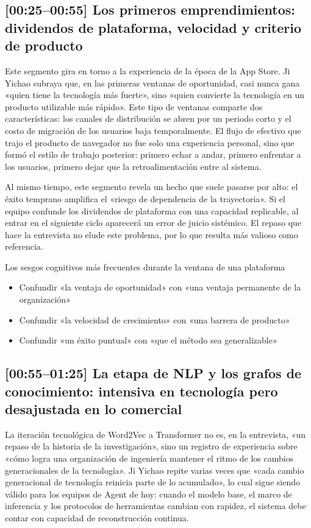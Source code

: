 \documentclass[a4paper]{article}
\begin{document}
\subsection{[00:25--00:55] Los primeros emprendimientos: dividendos de plataforma, velocidad y criterio de producto}

Este segmento gira en torno a la experiencia de la época de la App Store. Ji Yichao subraya que, en las primeras ventanas de oportunidad, casi nunca gana «quien tiene la tecnología más fuerte», sino «quien convierte la tecnología en un producto utilizable más rápido». Este tipo de ventanas comparte dos características: los canales de distribución se abren por un periodo corto y el costo de migración de los usuarios baja temporalmente. El flujo de efectivo que trajo el producto de navegador no fue solo una experiencia personal, sino que formó el estilo de trabajo posterior: primero echar a andar, primero enfrentar a los usuarios, primero dejar que la retroalimentación entre al sistema.

Al mismo tiempo, este segmento revela un hecho que suele pasarse por alto: el éxito temprano amplifica el «riesgo de dependencia de la trayectoria». Si el equipo confunde los dividendos de plataforma con una capacidad replicable, al entrar en el siguiente ciclo aparecerá un error de juicio sistémico. El repaso que hace la entrevista no elude este problema, por lo que resulta más valioso como referencia.

\begin{warningbox}{Los sesgos cognitivos más frecuentes durante la ventana de una plataforma}
\begin{itemize}
    \item Confundir «la ventaja de oportunidad» con «una ventaja permanente de la organización»
    \item Confundir «la velocidad de crecimiento» con «una barrera de producto»
    \item Confundir «un éxito puntual» con «que el método sea generalizable»
\end{itemize}
\end{warningbox}

\subsection{[00:55--01:25] La etapa de NLP y los grafos de conocimiento: intensiva en tecnología pero desajustada en lo comercial}

La iteración tecnológica de Word2Vec a Transformer no es, en la entrevista, «un repaso de la historia de la investigación», sino un registro de experiencia sobre «cómo logra una organización de ingeniería mantener el ritmo de los cambios generacionales de la tecnología». Ji Yichao repite varias veces que «cada cambio generacional de tecnología reinicia parte de lo acumulado», lo cual sigue siendo válido para los equipos de Agent de hoy: cuando el modelo base, el marco de inferencia y los protocolos de herramientas cambian con rapidez, el sistema debe contar con capacidad de reconstrucción continua.
\end{document}
